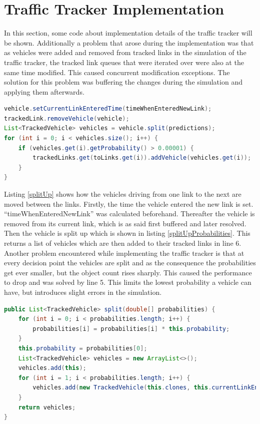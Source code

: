 \section{Traffic Tracker Implementation}

In this section, some code about implementation details of the traffic tracker will be shown. Additionally a problem that arose during the implementation was that as vehicles were added and removed from tracked links in the simulation of the traffic tracker, the tracked link queues that were iterated over were also at the same time modified. This caused concurrent modification exceptions. The solution for this problem was buffering the changes during the simulation and applying them afterwards.

\vspace{0.5em}

\begin{lstlisting}[caption={Split Up Vehicle to Multiple Links}, label=splitUp, language=Java]
vehicle.setCurrentLinkEnteredTime(timeWhenEnteredNewLink);
trackedLink.removeVehicle(vehicle);
List<TrackedVehicle> vehicles = vehicle.split(predictions);
for (int i = 0; i < vehicles.size(); i++) {
	if (vehicles.get(i).getProbability() > 0.00001) {
		trackedLinks.get(toLinks.get(i)).addVehicle(vehicles.get(i));
	}
}
\end{lstlisting}

Listing \ref{splitUp} shows how the vehicles driving from one link to the next are moved between the links. Firstly, the time the vehicle entered the new link is set. ``timeWhenEnteredNewLink'' was calculated beforehand. Thereafter the vehicle is removed from its current link, which is as said first buffered and later resolved. Then the vehicle is split up which is shown in listing \ref{splitUpProbabilities}. This returns a list of vehicles which are then added to their tracked links in line 6. Another problem encountered while implementing the traffic tracker is that at every decision point the vehicles are split and as the consequence the probabilities get ever smaller, but the object count rises sharply. This caused the performance to drop and was solved by line 5. This limits the lowest probability a vehicle can have, but introduces slight errors in the simulation.

\vspace{0.5em}

\begin{lstlisting}[caption={Split Up Vehicle Probabilities}, label=splitUpProbabilities, language=Java]
public List<TrackedVehicle> split(double[] probabilities) {
	for (int i = 0; i < probabilities.length; i++) {
		probabilities[i] = probabilities[i] * this.probability;
	}
	this.probability = probabilities[0];
	List<TrackedVehicle> vehicles = new ArrayList<>();
	vehicles.add(this);
	for (int i = 1; i < probabilities.length; i++) {
		vehicles.add(new TrackedVehicle(this.clones, this.currentLinkEnteredTime, probabilities[i]));
	}
	return vehicles;
}
\end{lstlisting}

